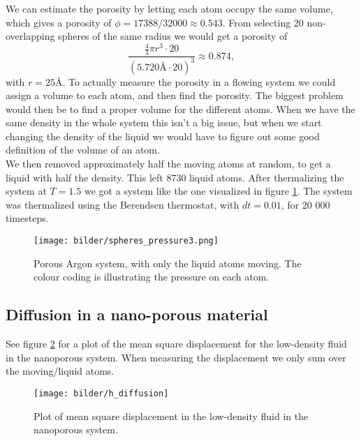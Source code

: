 We can estimate the porosity by letting each atom occupy the same volume, which gives a porosity of $\phi = 17388/32000 \approx 0.543$. From selecting 20 non-overlapping spheres of the same radius we would get a porosity of
\[
    \frac{\frac{4}{3}\pi r^3 \cdot 20}{\left(5.720\text{\AA} \cdot 20\right)^3} \approx 0.874,
\]
with $r = 25$\AA. To actually measure the porosity in a flowing system we could assign a volume to each atom, and then find the porosity. The biggest problem would then be to find a proper volume for the different atoms. When we have the same density in the whole system this isn't a big issue, but when we start changing the density of the liquid we would have to figure out some good definition of the volume of an atom. \\


We then removed approximately half the moving atoms at random, to get a liquid with half the density. This left 8730 liquid atoms. After thermalizing the system at $T = 1.5$ we got a system like the one visualized in figure \ref{fig:spheres_pressure}. The system was thermalized using the Berendsen thermostat, with $dt = 0.01$, for 20 000 timesteps.

\begin{figure}[ht!]
    \centering
    \texttt{[image: bilder/spheres\_pressure3.png]}
    \parbox{0.8\textwidth}{
        \caption{
            \small{
                Porous Argon system, with only the liquid atoms moving. The colour coding is illustrating the pressure on each atom.
            }
            \label{fig:spheres_pressure}
        }
    }
\end{figure}

\subsection*{Diffusion in a nano-porous material}

See figure \ref{fig:diffusion} for a plot of the mean square displacement for the low-density fluid in the nanoporous system. When measuring the displacement we only sum over the moving/liquid atoms.

\begin{figure}[ht!]
    \centering
    \texttt{[image: bilder/h\_diffusion]}
    \parbox{0.8\textwidth}{
        \caption{
            \small{
                Plot of mean square displacement in the low-density fluid in the nanoporous system.
            }
            \label{fig:diffusion}
        }
    }
\end{figure}


